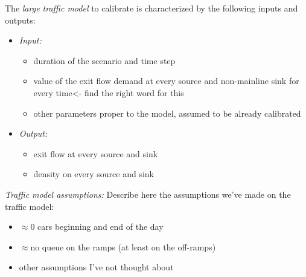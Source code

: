 The \emph{large traffic model} to calibrate is characterized by the following inputs and outputs:
\begin{itemize}
	\item \emph{Input:} 
	\begin{itemize}
		\item   duration of the scenario and time step
		\item   value of the exit flow demand at every source and non-mainline sink for every time\color{red}<- find the right word for this\color{black}
		\item	other parameters proper to the model, assumed to be already calibrated
	\end{itemize}
	\item \emph{Output:}
	\begin{itemize}
		\item   exit flow at every source and sink
		\item	density on every source and sink		
	\end{itemize}
\end{itemize}
\emph{Traffic model assumptions:} \color{red}Describe here the assumptions we've made on the traffic model:\color{black}
\begin{itemize}
	\item $\approx 0$ cars beginning and end of the day
	\item $\approx$no queue on the ramps (at least on the off-ramps)
	\item other assumptions I've not thought about
\end{itemize}
